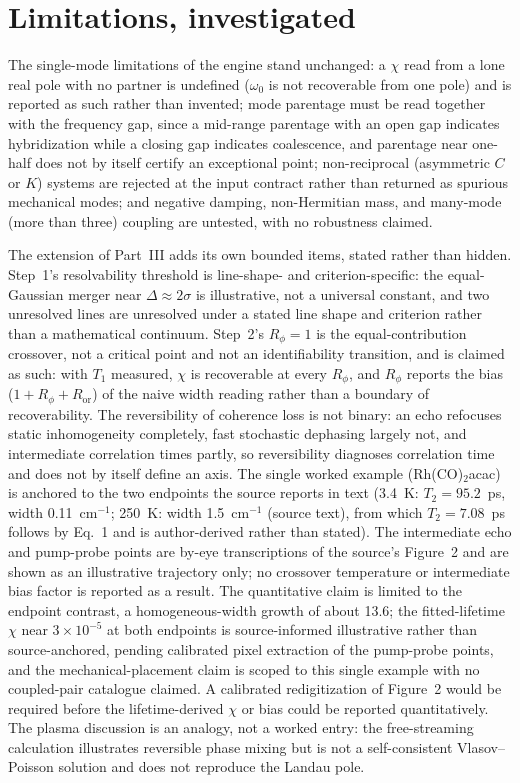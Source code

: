\section{Limitations, investigated}

The single-mode limitations of the engine stand unchanged: a \(\chi\) read from a lone real pole with no partner is undefined (\(\omega_0\) is not recoverable from one pole) and is reported as such rather than invented; mode parentage must be read together with the frequency gap, since a mid-range parentage with an open gap indicates hybridization while a closing gap indicates coalescence, and parentage near one-half does not by itself certify an exceptional point; non-reciprocal (asymmetric \(C\) or \(K\)) systems are rejected at the input contract rather than returned as spurious mechanical modes; and negative damping, non-Hermitian mass, and many-mode (more than three) coupling are untested, with no robustness claimed.

The extension of Part~III adds its own bounded items, stated rather than hidden. Step~1's resolvability threshold is line-shape- and criterion-specific: the equal-Gaussian merger near $\Delta \approx 2\sigma$ is illustrative, not a universal constant, and two unresolved lines are unresolved under a stated line shape and criterion rather than a mathematical continuum. Step~2's $R_\phi = 1$ is the equal-contribution crossover, not a critical point and not an identifiability transition, and is claimed as such: with $T_1$ measured, $\chi$ is recoverable at every $R_\phi$, and $R_\phi$ reports the bias ($1 + R_\phi + R_{\mathrm{or}}$) of the naive width reading rather than a boundary of recoverability. The reversibility of coherence loss is not binary: an echo refocuses static inhomogeneity completely, fast stochastic dephasing largely not, and intermediate correlation times partly, so reversibility diagnoses correlation time and does not by itself define an axis. The single worked example (Rh(CO)$_2$acac) is anchored to the two endpoints the source reports in text (3.4~K: $T_2 = 95.2$~ps, width 0.11~cm$^{-1}$; 250~K: width 1.5~cm$^{-1}$ (source text), from which $T_2 = 7.08$~ps follows by Eq.~1 and is author-derived rather than stated). The intermediate echo and pump-probe points are by-eye transcriptions of the source's Figure~2 and are shown as an illustrative trajectory only; no crossover temperature or intermediate bias factor is reported as a result. The quantitative claim is limited to the endpoint contrast, a homogeneous-width growth of about 13.6; the fitted-lifetime $\chi$ near $3\times10^{-5}$ at both endpoints is source-informed illustrative rather than source-anchored, pending calibrated pixel extraction of the pump-probe points, and the mechanical-placement claim is scoped to this single example with no coupled-pair catalogue claimed. A calibrated redigitization of Figure~2 would be required before the lifetime-derived $\chi$ or bias could be reported quantitatively. The plasma discussion is an analogy, not a worked entry: the free-streaming calculation illustrates reversible phase mixing but is not a self-consistent Vlasov--Poisson solution and does not reproduce the Landau pole.

